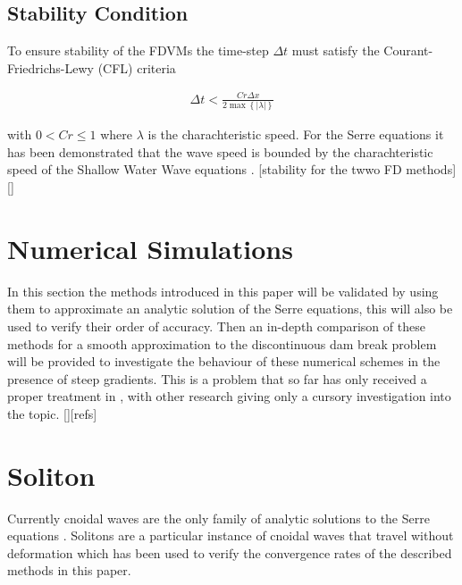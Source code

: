 \documentclass[SingleSpace,12pt,Proceedings]{Serre_ASCE}
\begin{document}
\subsection{Stability Condition} 
To ensure stability of the FDVMs the time-step $\Delta t$ must satisfy the Courant-Friedrichs-Lewy (CFL) criteria \cite{Harten-etal-1983-357}

\begin{gather}
\label{eq:CFL}
\Delta t < \frac{Cr \Delta x}{2\max \left\lbrace |\lambda| \right\rbrace}
\end{gather}

 with $0<Cr\le 1$ where $\lambda$ is the charachteristic speed. For the Serre equations it has been demonstrated that the wave speed is bounded by the charachteristic speed of the Shallow Water Wave equations \cite{Hank-etal-2010-2034}.
 [stability for the twwo FD methods][]

\section{Numerical Simulations}
\label{section:Numerical Simulations}
In this section the methods introduced in this paper will be validated by using them to approximate an analytic solution of the Serre equations, this will also be used to verify their order of accuracy. Then an in-depth comparison of these methods for a smooth approximation to the discontinuous dam break problem will be provided to investigate the behaviour of these numerical schemes in the presence of steep gradients. This is a problem that so far has only received a proper treatment in \cite{El-etal-2006}, with other research giving only a cursory investigation into the topic. [][refs]

\section{Soliton}
\label{section:Convergence Rate}
Currently cnoidal waves are the only family of analytic solutions to the Serre equations \cite{Carter-Cienfuegos-2010-259}. Solitons are a particular instance of cnoidal waves that travel without deformation which has been used to verify the convergence rates of the described methods in this paper. 
\end{document}

